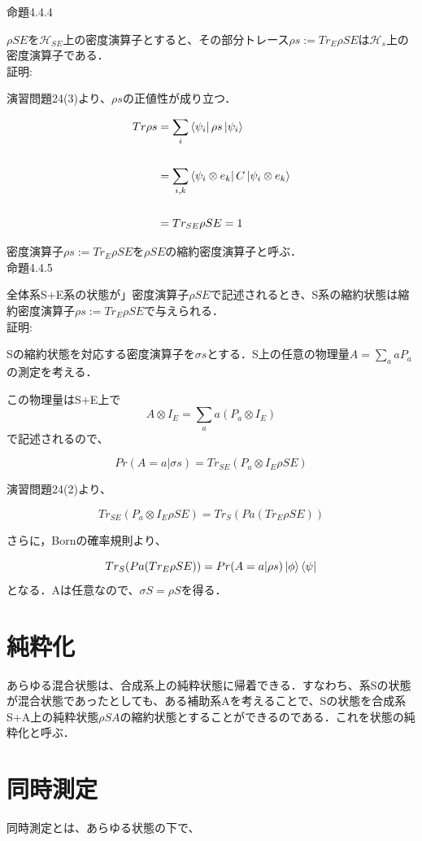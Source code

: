 \documentclass[xelatex,ja=standard,jafont=noto]{bxjsarticle}
\begin{document}
\newpage

命題4.4.4

    $\rho SE$を$\mathcal{H}_{SE}$上の密度演算子とすると、その部分トレース$\rho s:=Tr_{E}\rho SE$は$\mathcal{H}_{s}$上の密度演算子である．\\
    
    証明:
    
    演習問題24(3)より、$\rho s$の正値性が成り立つ．
    
    \begin{equation}
        \begin{aligned}
            Tr \rho s&=\sum_{i}\bra{\psi_{i}}\rho s\ket{\psi_{i}}\\
            \\
            &=\sum_{i,k}\bra{\psi_{i}\otimes e_{k}}C\ket{\psi_{i}\otimes e_{k}}\\
            \\
            &=Tr_{SE}\rho SE=1
        \end{aligned}
    \end{equation}
    
密度演算子$\rho s:=Tr_{E}\rho SE$を$\rho SE$の縮約密度演算子と呼ぶ．\\


命題4.4.5

全体系S+E系の状態が」密度演算子$\rho SE$で記述されるとき、S系の縮約状態は縮約密度演算子$\rho s:=Tr_{E}\rho SE$で与えられる．\\

証明:

Sの縮約状態を対応する密度演算子を$\sigma s$とする．S上の任意の物理量$A=\sum_{a}aP_{a}$の測定を考える．

この物理量はS+E上で
\begin{equation}
    A\otimes I_{E}=\sum_{a}a(P_{a}\otimes　I_{E})
\end{equation}
で記述されるので、


\begin{equation}
    Pr(A=a|\sigma s)=Tr_{SE}(P_{a}\otimes　I_{E}\rho SE)
\end{equation}

演習問題24(2)より、

\begin{equation}
    Tr_{SE}(P_{a}\otimes　I_{E}\rho SE)=Tr_{S}(P{a}(Tr_{E}\rho SE))
\end{equation}

さらに，Bornの確率規則より、

\begin{equation}
    Tr_{S}(P{a}(Tr_{E}\rho SE))=Pr(A=a|\rho s)\ket{\phi}\bra{\psi}
\end{equation}
となる．Aは任意なので、$\sigma S=\rho S$を得る．\\


\section{純粋化}

あらゆる混合状態は、合成系上の純粋状態に帰着できる．すなわち、系Sの状態が混合状態であったとしても、ある補助系Aを考えることで、Sの状態を合成系S+A上の純粋状態$\rho SA$の縮約状態とすることができるのである．これを状態の純粋化と呼ぶ．


\section{同時測定}
同時測定とは、あらゆる状態の下で、
\end{document}
